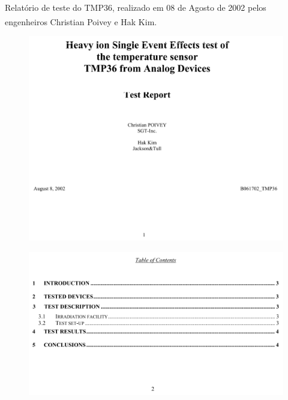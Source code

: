 \documentclass[
	12pt,				%
	openright,			%
	oneside,			%
	a4paper,			%
	english,			%
	french,				%
	spanish,			%
	brazil,				%
	oldfontcommands
	]{abntex2}
\begin{document}
\begin{anexosenv}
	Relatório de teste do TMP36, realizado em 08 de Agosto de 2002 pelos engenheiros Christian Poivey e Hak Kim.\textsuperscript{\cite{TMP36}}
	
	\begin{figure}[th]
		\centering
		\includegraphics[width=0.85\linewidth]{./anexos/tmp36_1}	
	\end{figure}	
	
	\begin{figure}[th]
		\centering
		\includegraphics[width=0.85\linewidth]{./anexos/tmp36_2}	
	\end{figure}	
	

\end{anexosenv}
\end{document}
